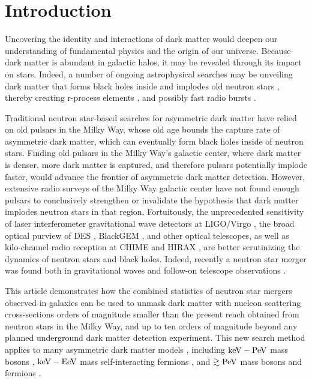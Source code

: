 \documentclass[nofootinbib,longbibliography,prd,floatfix,superscriptaddress,twocolumn]{revtex4-1}
\begin{document}
\maketitle
\section{Introduction}
\label{sec:intro}

Uncovering the identity and interactions of dark matter would deepen our understanding of fundamental physics and the origin of our universe. Because dark matter is abundant in galactic halos, it may be revealed through its impact on stars. Indeed, a number of ongoing astrophysical searches may be unveiling dark matter that forms black holes inside and implodes old neutron stars \cite{Bramante:2014zca,Bramante:2015dfa,Goldman:1989nd,deLavallaz:2010wp,Kouvaris:2010jy}, thereby creating r-process elements \cite{Bramante:2016mzo}, and possibly fast radio bursts \cite{Fuller:2014rza}. 

Traditional neutron star-based searches for asymmetric dark matter have relied on old pulsars in the Milky Way, whose old age bounds the capture rate of asymmetric dark matter, which can eventually form black holes inside of neutron stars. Finding old pulsars in the Milky Way's galactic center, where dark matter is denser, more dark matter is captured, and therefore pulsars potentially implode faster, would advance the frontier of asymmetric dark matter detection. However, extensive radio surveys of the Milky Way galactic center have not found enough pulsars to conclusively strengthen or invalidate the hypothesis that dark matter implodes neutron stars in that region.
Fortuitously, the unprecedented sensitivity of laser interferometer gravitational wave detectors at LIGO/Virgo \cite{Abbott:2016ymx}, the broad optical purview of DES \cite{Doctor:2016gdi,Soares-Santos:2016qeb}, BlackGEM \cite{Ghosh:2014yga}, and other optical telescopes, as well as kilo-channel radio reception at CHIME \cite{Berger:2016ejd} and HIRAX \cite{Newburgh:2016mwi}, are better scrutinizing the dynamics of neutron stars and black holes. Indeed, recently a neutron star merger was found both in gravitational waves \cite{TheLIGOScientific:2017qsa} and follow-on telescope observations \cite{GBM:2017lvd}.

This article demonstrates how the combined statistics of neutron star mergers observed in galaxies can be used to unmask dark matter with nucleon scattering cross-sections orders of magnitude smaller than the present reach obtained from neutron stars in the Milky Way, and up to ten orders of magnitude beyond any planned underground dark matter detection experiment. This new search method applies to many asymmetric dark matter models \cite{Petraki:2013wwa,Zurek:2013wia}, including $\rm keV-PeV$ mass bosons \cite{Bramante:2014zca,Bramante:2015dfa,Goldman:1989nd,deLavallaz:2010wp,Kouvaris:2010jy,McDermott:2011jp,Bramante:2013hn,Bell:2013xk,
Bertoni:2013bsa,Guver:2012ba,Kouvaris:2013kra,Kurita:2015vga}, $\rm keV-EeV$ mass self-interacting fermions \cite{Kouvaris:2011gb,Bramante:2013nma,Bramante:2015dfa}, and $\rm \gtrsim PeV$ mass bosons and fermions \cite{deLavallaz:2010wp,Bramante:2015cua,Bramante:2016mzo,Bramante:2017obj}. 
\end{document}
